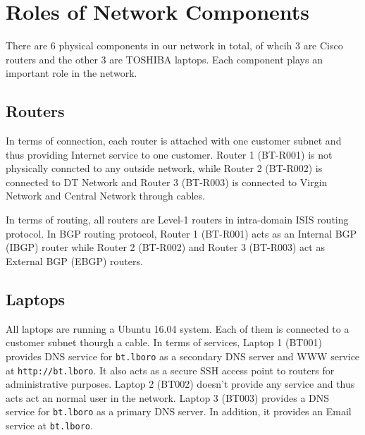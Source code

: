 \section{Roles of Network Components}
\label{sec:components}

There are 6 physical components in our network in total, of whcih 3 are Cisco routers and the other 3 are TOSHIBA laptops. Each component plays an important role in the network.

\subsection{Routers}
In terms of connection, each router is attached with one customer subnet and thus providing Internet service to one customer. Router 1 (BT-R001) is not physically conncted to any outside network, while Router 2 (BT-R002) is connected to DT Network and Router 3 (BT-R003) is connected to Virgin Network and Central Network through cables.

In terms of routing, all routers are Level-1 routers in intra-domain ISIS routing protocol. In BGP routing protocol, Router 1 (BT-R001) acts as an Internal BGP (IBGP) router while Router 2 (BT-R002) and Router 3 (BT-R003) act as External BGP (EBGP) routers. 



\subsection{Laptops}

All laptops are running a Ubuntu 16.04 system. Each of them is connected to a customer subnet thourgh a cable. 
In terms of services, Laptop 1 (BT001) provides DNS service for \texttt{bt.lboro} as a secondary DNS server and WWW service at \texttt{http://bt.lboro}. It also acts as a secure SSH access point to routers for administrative purposes. 
Laptop 2 (BT002) doesn't provide any service and thus acts act an normal user in the network. 
Laptop 3 (BT003) provides a DNS service for \texttt{bt.lboro} as a primary DNS server. In addition, it provides an Email service at \texttt{bt.lboro}.

